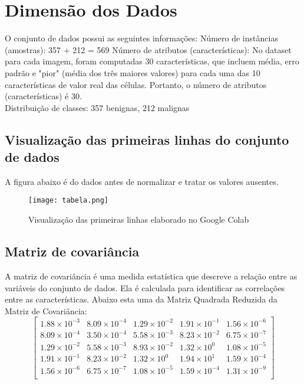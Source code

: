 \documentclass{article}
\begin{document}
\section{Dimensão dos Dados}

O conjunto de dados possui as seguintes informações:
Número de instâncias (amostras): 357 + 212 = 569
Número de atributos (características): No dataset para cada imagem, foram computadas 30 características, que incluem média, erro padrão e "pior" (média dos três maiores valores) para cada uma das 10 características de valor real das células. Portanto, o número de atributos (características) é 30. \\ Distribuição de classes: 357 benignas, 212 malignas


\subsection{Visualização das primeiras linhas do conjunto de dados}
A figura abaixo é do dados antes de normalizar e tratar os valores ausentes.
\begin{figure}
\centering
\texttt{[image: tabela.png]}
\caption{\label{fig:frog}Visualização das primeiras linhas elaborado no Google Colab}
\end{figure}

\newpage
\subsection{Matriz de covariância}

A matriz de covariância é uma medida estatística que descreve a relação entre as variáveis do conjunto de dados. Ela é calculada para identificar as correlações entre as características. 
Abaixo esta uma da Matriz Quadrada Reduzida da Matriz de Covariância:
\[
\begin{bmatrix}
1.88 \times 10^{-3} & 8.09 \times 10^{-4} & 1.29 \times 10^{-2} & 1.91 \times 10^{-1} & 1.56 \times 10^{-6} \\
8.09 \times 10^{-4} & 3.50 \times 10^{-4} & 5.58 \times 10^{-3} & 8.23 \times 10^{-2} & 6.75 \times 10^{-7} \\
1.29 \times 10^{-2} & 5.58 \times 10^{-3} & 8.93 \times 10^{-2} & 1.32 \times 10^{0} & 1.08 \times 10^{-5} \\
1.91 \times 10^{-1} & 8.23 \times 10^{-2} & 1.32 \times 10^{0} & 1.94 \times 10^{1} & 1.59 \times 10^{-4} \\
1.56 \times 10^{-6} & 6.75 \times 10^{-7} & 1.08 \times 10^{-5} & 1.59 \times 10^{-4} & 1.31 \times 10^{-9} \\
\end{bmatrix}
\]
\end{document}
